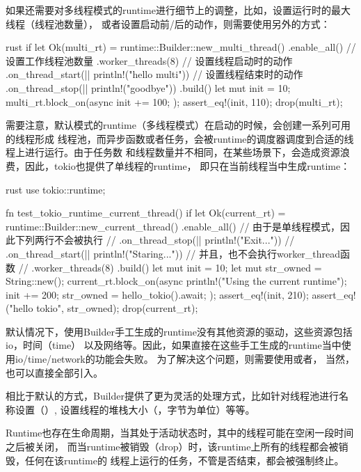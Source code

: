 如果还需要对多线程模式的runtime进行细节上的调整，比如，设置运行时的最大线程（线程池数量），
或者设置启动前/后的动作，则需要使用另外的方式：
\begin{code-block}{rust}
if let Ok(multi_rt) = runtime::Builder::new_multi_thread()
    .enable_all()
    // 设置工作线程池数量
    .worker_threads(8)
    // 设置线程启动时的动作
    .on_thread_start(|| println!("hello multi"))
    // 设置线程结束时的动作
    .on_thread_stop(|| println!("goodbye"))
    .build()
{
    let mut init = 10;
    multi_rt.block_on(async {
        init += 100;
    });
    assert_eq!(init, 110);
    drop(multi_rt);
}
\end{code-block}
需要注意，默认模式的runtime（多线程模式）在启动的时候，会创建一系列可用的线程形成
线程池，而异步函数或者任务，会被runtime的调度器调度到合适的线程上进行运行。由于任务数
和线程数量并不相同，在某些场景下，会造成资源浪费，因此，tokio也提供了单线程的runtime，
即只在当前线程当中生成runtime：
\begin{code-block}{rust}
use tokio::runtime;

fn test_tokio_runtime_current_thread() {
    if let Ok(current_rt) = runtime::Builder::new_current_thread()
        .enable_all()
        // 由于是单线程模式，因此下列两行不会被执行
        // .on_thread_stop(|| println!("Exit..."))
        // .on_thread_start(|| println!("Staring..."))
        // 并且，也不会执行worker_thread函数
        // .worker_threads(8)
        .build()
    {
        let mut init = 10;
        let mut str_owned = String::new();
        current_rt.block_on(async {
            println!("Using the current runtime");
            init += 200;
            str_owned = hello_tokio().await;
        });
        assert_eq!(init, 210);
        assert_eq!("hello tokio", str_owned);
        drop(current_rt);
    }
}
\end{code-block}

默认情况下，使用Builder手工生成的runtime没有其他资源的驱动，这些资源包括io，时间（time）
以及网络等。因此，如果直接在这些手工生成的runtime当中使用io/time/network的功能会失败。
为了解决这个问题，则需要使用或者，
当然，也可以直接全部引入。

相比于默认的方式，Builder提供了更为灵活的处理方式，比如针对线程池进行名称设置（）,
设置线程的堆栈大小（，字节为单位）等等。

Runtime也存在生命周期，当其处于活动状态时，其中的线程可能在空闲一段时间之后被关闭，
而当runtime被销毁（drop）时，该runtime上所有的线程都会被销毁，任何在该runtime的
线程上运行的任务，不管是否结束，都会被强制终止。

